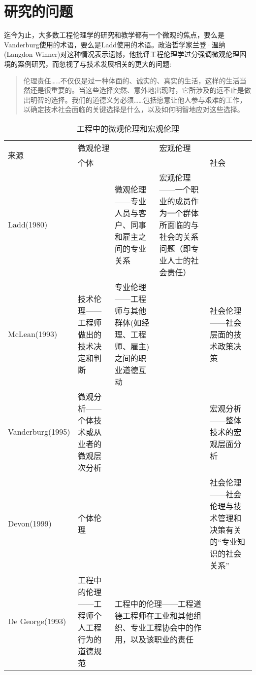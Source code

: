 \documentclass[lang=cn,11pt,a4paper]{elegantpaper}
\begin{document}
\section{研究的问题}
迄今为止，大多数工程伦理学的研究和教学都有一个微观的焦点，要么是Vanderburg使用的术语，要么是Ladd使用的术语。政治哲学家兰登·温纳(Langdon Winner)对这种情况表示遗憾，他批评工程伦理学过分强调微观伦理困境的案例研究，而忽视了与技术发展相关的更大的问题:
\begin{quotation}
  伦理责任……不仅仅是过一种体面的、诚实的、真实的生活，这样的生活当然还是很重要的。当这些选择突然、意外地出现时，它所涉及的远不止是做出明智的选择。我们的道德义务必须……包括愿意让他人参与艰难的工作，以确定技术社会面临的关键选择是什么，以及如何明智地应对这些选择。
\end{quotation}


\begin{table}[htbp]

  \centering
  \caption{工程中的微观伦理和宏观伦理}
 
  \begin{tabular}{|l|p{2.5cm}|p{3cm}|p{3cm}|p{2.5cm}|}
    \hline
    \multirow{2}{*}{来源} & \multicolumn{2}{l|}{微观伦理} & \multicolumn{2}{l|}{宏观伦理} \\ \cline{2-5} 
                        & 个体          & \multicolumn{2}{l|}{}     & 社会          \\ \hline
    Ladd(1980)          &             & 微观伦理——专业人员与客户、同事和雇主之间的专业关系         & 宏观伦理——一个职业的成员作为一个群体所面临的与社会的关系问题（即专业人士的社会责任）          &             \\ \hline
    McLean(1993)        & 技术伦理——工程师做出的技术决定和判断          & 专业伦理——工程师与其他群体(如经理、工程师、雇主)之间的职业道德互动          &             & 社会伦理——社会层面的技术政策决策          \\ \hline
    Vanderburg(1995)    & 微观分析——个体技术或从业者的微观层次分析          &             &             & 宏观分析——整体技术的宏观层面分析          \\ \hline
    Devon(1999)         & 个体伦理          &             &             & 社会伦理——社会伦理与技术管理和决策有关的“专业知识的社会关系”          \\ \hline
    De George(1993)     & 工程中的伦理——工程师个人工程行为的道德规范          & \multicolumn{2}{p{6cm}|}{工程中的伦理——工程道德工程师在工业和其他组织、专业工程协会中的作用，以及该职业的责任}   &             \\ \hline
  \end{tabular}
\end{table}
\end{document}
